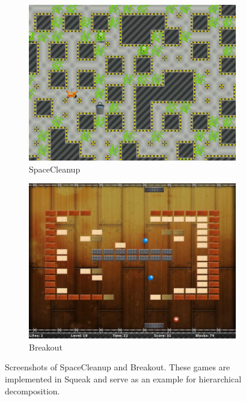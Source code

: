 \begin{figure}[!htp]
\centering
\begin{subfigure}[b]{0.45\textwidth}
    \includegraphics[width=\textwidth]{screen_scleanup.jpeg}
    \caption{SpaceCleanup}
\end{subfigure}
\qquad
\begin{subfigure}[b]{0.45\textwidth}
    \includegraphics[width=\textwidth]{screen_breakout.jpeg}
    \caption{Breakout}
\end{subfigure}
\caption[Screenshots: SpaceCleanup and Breakout]{Screenshots of SpaceCleanup and Breakout. These games are implemented in Squeak and serve as an example for hierarchical decomposition.}
\label{fig:usecase_games}
\end{figure}


